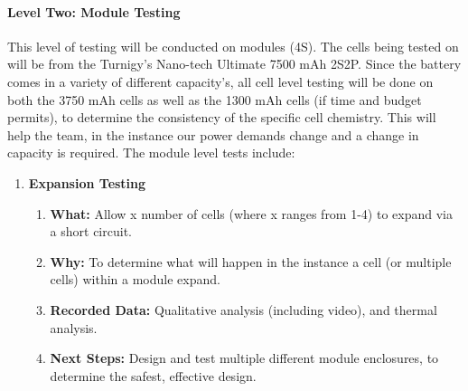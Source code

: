 \documentclass[main.tex]{subfiles}
\begin{document}
    \paragraph{Level Two: Module Testing}
    This level of testing will be conducted on modules (4S). The cells being tested on will be from the Turnigy’s Nano-tech Ultimate  7500 mAh 2S2P. Since the battery comes in a variety of different capacity’s, all cell level testing will be done on both the 3750 mAh cells as well as the 1300 mAh cells (if time and budget permits), to determine the consistency of the specific cell chemistry. This will help the team, in the instance our power demands change and a change in capacity is required. The module level tests include:
    \begin{enumerate}
        \item \textbf{Expansion Testing}
        \begin{enumerate}
            \item \textbf{What: }Allow x number of cells (where x ranges from 1-4) to expand via a short circuit.
            \item \textbf{Why: }To determine what will happen in the instance a cell (or multiple cells) within a module expand.
            \item \textbf{Recorded Data: }Qualitative analysis (including video), and thermal analysis.
            \item \textbf{Next Steps: }Design and test multiple different module enclosures, to determine the safest, effective design.
        \end{enumerate}
    \end{enumerate}
\end{document}
